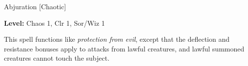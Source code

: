 
Abjuration [Chaotic]

\textbf{Level:} Chaos 1, Clr 1, Sor/Wiz 1

This spell functions like \textit{protection from evil}, except that the deflection 
and resistance bonuses apply to attacks from lawful creatures, and lawful summoned 
creatures cannot touch the subject.

